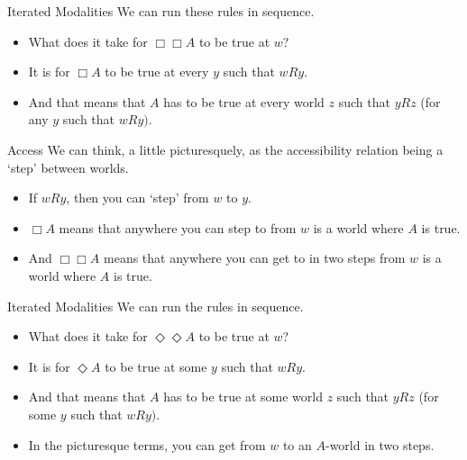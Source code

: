 \documentclass[
  14pt,
  letterpaper,
  ignorenonframetext,
  aspectratio=169,
  handout]{beamer}
\providecommand{\tightlist}{%
  \setlength{\itemsep}{0pt}\setlength{\parskip}{0pt}}\usepackage{longtable,booktabs,array}
\begin{document}
\begin{frame}{Iterated Modalities}
\protect\hypertarget{iterated-modalities}{}
We can run these rules in sequence.

\begin{itemize}[<+->]
\tightlist
\item
  What does it take for \(\Box \Box A\) to be true at \(w\)?
\item
  It is for \(\Box A\) to be true at every \(y\) such that \(wRy\).
\item
  And that means that \(A\) has to be true at every world \(z\) such
  that \(yRz\) (for any \(y\) such that \(wRy)\).
\end{itemize}
\end{frame}

\begin{frame}{Access}
\protect\hypertarget{access}{}
We can think, a little picturesquely, as the accessibility relation
being a `step' between worlds.

\begin{itemize}[<+->]
\tightlist
\item
  If \(wRy\), then you can `step' from \(w\) to \(y\).
\item
  \(\Box A\) means that anywhere you can step to from \(w\) is a world
  where \(A\) is true.
\item
  And \(\Box \Box A\) means that anywhere you can get to in two steps
  from \(w\) is a world where \(A\) is true.
\end{itemize}
\end{frame}

\begin{frame}{Iterated Modalities}
\protect\hypertarget{iterated-modalities-1}{}
We can run the rules in sequence.

\begin{itemize}[<+->]
\tightlist
\item
  What does it take for \(\Diamond \Diamond A\) to be true at \(w\)?
\item
  It is for \(\Diamond A\) to be true at some \(y\) such that \(wRy\).
\item
  And that means that \(A\) has to be true at some world \(z\) such that
  \(yRz\) (for some \(y\) such that \(wRy)\).
\item
  In the picturesque terms, you can get from \(w\) to an \(A\)-world in
  two steps.
\end{itemize}
\end{frame}
\end{document}
